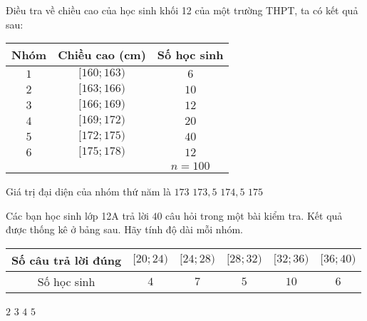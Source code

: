 \begin{ex}%
Điều tra về chiều cao của học sinh khối 12 của một trường THPT, ta có kết quả sau:
\begin{center}
\begin{tabular}{|c|c|c|}
\hline
Nhóm & Chiều cao (cm) & Số học sinh\\
\hline
$1$ & $[160;163)$ & $6$\\
\hline
$2$ & $[163;166)$ & $10$\\
\hline
$3$ & $[166;169)$ & $12$\\
\hline
$4$ & $[169;172)$ & $20$\\
\hline
$5$ & $[172;175)$ & $40$\\
\hline
$6$ & $[175;178)$ & $12$\\
\hline
& & $n=100$\\
\hline
\end{tabular}
\end{center}
Giá trị đại diện của nhóm thứ năm là
\choice
{$173$}
{\True $173{,}5$}
{$174{,}5$}
{$175$}

\end{ex}

\begin{ex}%
Các bạn học sinh lớp 12A trả lời $40$ câu hỏi trong một bài kiểm tra. Kết quả được thống kê ở bảng sau. Hãy tính độ dài mỗi nhóm.
\begin{center}
\begin{tabular}{|c|c|c|c|c|c|}
\hline
Số câu trả lời đúng & $[20;24)$ & $[24;28)$ & $[28;32)$ & $[32;36)$ & $[36;40)$ \\
\hline
Số học sinh & $4$ & $7$ & $5$ & $10$ & $6$ \\
\hline
\end{tabular}
\end{center}
\choice
{$2$}
{$3$}
{\True $4$}
{$5$}

\end{ex}

